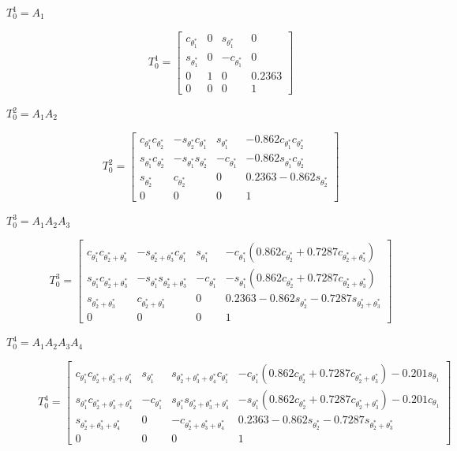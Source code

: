 \documentclass[journal]{new-aiaa}
\begin{document}
\begin{description}
    \item[$T_0^1=A_1$] \hfill
    $$
    T_0^1 =
    \begin{bmatrix}
        c_{\theta_1^*} & 0 & s_{\theta_1^*} & 0 \\
        s_{\theta_1^*} & 0 & -c_{\theta_1^*} & 0 \\
        0 & 1 & 0 & 0.2363 \\
        0 & 0 & 0 & 1
    \end{bmatrix}
    $$

    \item[$T_0^2=A_1A_2$] \hfill

    $$
    T_0^2 = \begin{bmatrix}
        c_{\theta_1^*}c_{\theta_2^*} & -s_{\theta_2^*}c_{\theta_1^*} & s_{\theta_1^*} & -0.862c_{\theta_1^*}c_{\theta_2^*} \\
        s_{\theta_1^*}c_{\theta_2^*} & -s_{\theta_1^*}s_{\theta_2^*} & -c_{\theta_1^*} & -0.862s_{\theta_1^*}c_{\theta_2^*} \\
        s_{\theta_2^*} & c_{\theta_2^*} & 0 & 0.2363-0.862 s_{\theta_2^*} \\
        0 & 0 & 0 & 1        
    \end{bmatrix}
    $$

    \item[$T_0^3=A_1A_2A_3$] \hfill

    $$
    T_0^3 = \begin{bmatrix}
        c_{\theta_1^*}c_{\theta_2^*+\theta_3^*} & -s_{\theta_2^*+\theta_3^*}c_{\theta_1^*} & s_{\theta_1^*} & -c_{\theta_1^*}(0.862c_{\theta_2^*}+0.7287c_{\theta_2^*+\theta_3^*}) \\
        s_{\theta_1^*}c_{\theta_2^*+\theta_3^*} & -s_{\theta_1^*}s_{\theta_2^*+\theta_3^*} & -c_{\theta_1^*} & -s_{\theta_1^*}(0.862c_{\theta_2^*}+0.7287c_{\theta_2^*+\theta_3^*}) \\
        s_{\theta_2^*+\theta_3^*} & c_{\theta_2^*+\theta_3^*} & 0 & 0.2363-0.862 s_{\theta_2^*} -0.7287 s_{\theta_2^*+\theta_3^*} \\
        0 & 0 & 0 & 1        
    \end{bmatrix}
    $$

    \item[$T_0^4=A_1A_2A_3A_4$] \hfill

    $$
    T_0^4 = \begin{bmatrix}
        c_{\theta_1^*}c_{\theta_2^*+\theta_3^*+\theta_4^*} & s_{\theta_1^*} & s_{\theta_2^*+\theta_3^*+\theta_4^*}c_{\theta_1^*} & -c_{\theta_1^*}(0.862c_{\theta_2^*}+0.7287c_{\theta_2^*+\theta_3^*})-0.201s_{\theta_1} \\
        s_{\theta_1^*}c_{\theta_2^*+\theta_3^*+\theta_4^*} & -c_{\theta_1^*} & s_{\theta_1^*}s_{\theta_2^*+\theta_3^*+\theta_4^*} & -s_{\theta_1^*}(0.862c_{\theta_2^*}+0.7287c_{\theta_2^*+\theta_3^*})-0.201c_{\theta_1} \\
        s_{\theta_2^*+\theta_3^*+\theta_4^*} & 0 & -c_{\theta_2^*+\theta_3^*+\theta_4^*} & 0.2363-0.862 s_{\theta_2^*} -0.7287 s_{\theta_2^*+\theta_3^*} \\
        0 & 0 & 0 & 1        
    \end{bmatrix}
    $$


\end{description}
\end{document}
